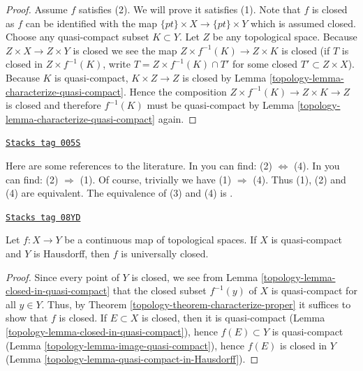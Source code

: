 \begin{proof}
\medskip\noindent
Assume $f$ satisfies (2). We will prove it satisfies (1).
Note that $f$ is closed as $f$ can be identified with the map
$\{pt\} \times X \to \{pt\} \times Y$ which is assumed closed.
Choose any quasi-compact subset $K \subset Y$.
Let $Z$ be any topological space.
Because $Z \times X \to Z \times Y$ is closed
we see the map $Z \times f^{-1}(K) \to Z \times K$
is closed (if $T$ is closed in $Z \times f^{-1}(K)$, write
$T = Z \times f^{-1}(K) \cap T'$ for some closed
$T' \subset Z \times X$). Because $K$ is quasi-compact,
$K \times Z\to Z$ is closed by Lemma \ref{topology-lemma-characterize-quasi-compact}.
Hence the composition $Z \times f^{-1}(K)\to Z \times K \to Z$
is closed and therefore $f^{-1}(K)$ must be quasi-compact
by Lemma \ref{topology-lemma-characterize-quasi-compact} again.
\end{proof}

\begin{remark}
\label{topology-remark-proof-literature}
\href{https://stacks.math.columbia.edu/tag/005S}{\texttt{Stacks tag 005S}}

Here are some references to the literature.
In \cite[I, p. 75, Theorem 1]{Bourbaki} you can find:
(2) $\Leftrightarrow$ (4).
In \cite[I, p. 77, Proposition 6]{Bourbaki} you can find:
(2) $\Rightarrow$ (1).
Of course, trivially we have (1) $\Rightarrow$ (4).
Thus (1), (2) and (4) are equivalent.
The equivalence of (3) and (4) is \cite[Chapter II, Exercise 25]{LangReal}.
\end{remark}

\begin{lemma}
\label{topology-lemma-closed-map}
\href{https://stacks.math.columbia.edu/tag/08YD}{\texttt{Stacks tag 08YD}}


Let $f : X \to Y$ be a continuous map of topological spaces.
If $X$ is quasi-compact and $Y$ is Hausdorff, then $f$ is
universally closed.
\end{lemma}

\begin{proof}

Since every point of $Y$ is closed, we see from
Lemma \ref{topology-lemma-closed-in-quasi-compact}
that the closed subset $f^{-1}(y)$ of $X$ is quasi-compact for all $y \in Y$.
Thus, by Theorem \ref{topology-theorem-characterize-proper}
it suffices to show that $f$ is closed.
If $E \subset X$ is closed, then it is quasi-compact
(Lemma \ref{topology-lemma-closed-in-quasi-compact}),
hence $f(E) \subset Y$ is quasi-compact
(Lemma \ref{topology-lemma-image-quasi-compact}),
hence $f(E)$ is closed in $Y$
(Lemma \ref{topology-lemma-quasi-compact-in-Hausdorff}).
\end{proof}

